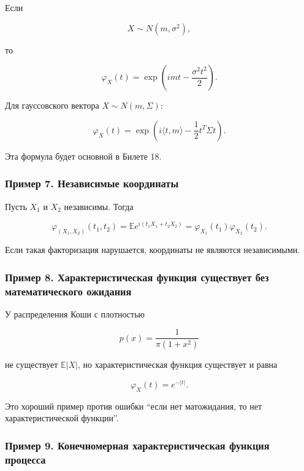 \documentclass[
  11pt,
  a4paper,
]{article}
\begin{document}
Если

\[
X\sim N(m,\sigma^2),
\]

то

\[
\varphi_X(t)=\exp\left(imt-\frac{\sigma^2t^2}{2}\right).
\]

Для гауссовского вектора \(X\sim N(m,\Sigma)\):

\[
\varphi_X(t)
=
\exp\left(i\langle t,m\rangle-\frac12 t^T\Sigma t\right).
\]

Эта формула будет основной в Билете 18.

\subsubsection{Пример 7. Независимые
координаты}\label{ux43fux440ux438ux43cux435ux440-7.-ux43dux435ux437ux430ux432ux438ux441ux438ux43cux44bux435-ux43aux43eux43eux440ux434ux438ux43dux430ux442ux44b}

Пусть \(X_1\) и \(X_2\) независимы. Тогда

\[
\varphi_{(X_1,X_2)}(t_1,t_2)
=
\mathbb E e^{i(t_1X_1+t_2X_2)}
=
\varphi_{X_1}(t_1)\varphi_{X_2}(t_2).
\]

Если такая факторизация нарушается, координаты не являются независимыми.

\subsubsection{Пример 8. Характеристическая функция существует без
математического
ожидания}\label{ux43fux440ux438ux43cux435ux440-8.-ux445ux430ux440ux430ux43aux442ux435ux440ux438ux441ux442ux438ux447ux435ux441ux43aux430ux44f-ux444ux443ux43dux43aux446ux438ux44f-ux441ux443ux449ux435ux441ux442ux432ux443ux435ux442-ux431ux435ux437-ux43cux430ux442ux435ux43cux430ux442ux438ux447ux435ux441ux43aux43eux433ux43e-ux43eux436ux438ux434ux430ux43dux438ux44f}

У распределения Коши с плотностью

\[
p(x)=\frac1{\pi(1+x^2)}
\]

не существует \(\mathbb E|X|\), но характеристическая функция существует
и равна

\[
\varphi_X(t)=e^{-|t|}.
\]

Это хороший пример против ошибки ``если нет матожидания, то нет
характеристической функции''.

\subsubsection{Пример 9. Конечномерная характеристическая функция
процесса}\label{ux43fux440ux438ux43cux435ux440-9.-ux43aux43eux43dux435ux447ux43dux43eux43cux435ux440ux43dux430ux44f-ux445ux430ux440ux430ux43aux442ux435ux440ux438ux441ux442ux438ux447ux435ux441ux43aux430ux44f-ux444ux443ux43dux43aux446ux438ux44f-ux43fux440ux43eux446ux435ux441ux441ux430}
\end{document}
